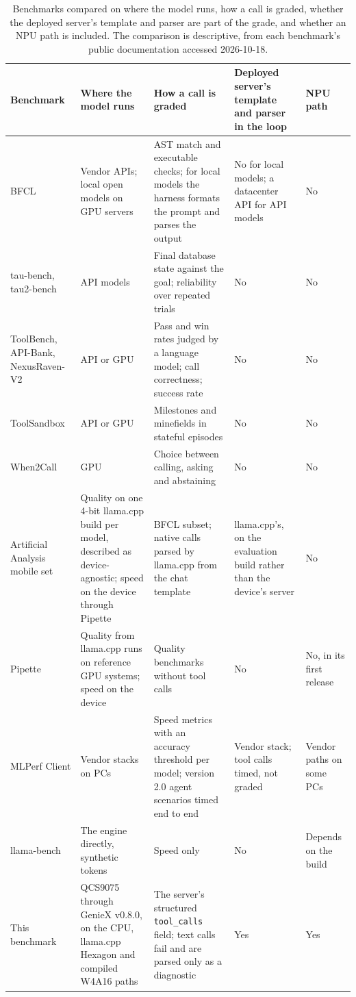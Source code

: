 \documentclass[11pt]{article}
\begin{document}
\begin{table}[tbp]
\centering
\caption{Benchmarks compared on where the model runs, how a call is graded, whether the deployed server's template and parser are part of the grade, and whether an NPU path is included. The comparison is descriptive, from each benchmark's public documentation accessed 2026-10-18.}
\label{tab:related}
\footnotesize
\begin{tabularx}{\linewidth}{@{}>{\raggedright\arraybackslash}p{2.3cm}LLL>{\raggedright\arraybackslash}p{1.7cm}@{}}
\toprule
Benchmark & Where the model runs & How a call is graded & Deployed server's template and parser in the loop & NPU path \\
\midrule
BFCL \citep{bfcl2025,bfclLeaderboard} & Vendor APIs; local open models on GPU servers & AST match and executable checks; for local models the harness formats the prompt and parses the output & No for local models; a datacenter API for API models & No \\
tau-bench, tau2-bench \citep{taubench,tau2bench} & API models & Final database state against the goal; reliability over repeated trials & No & No \\
ToolBench, API-Bank, NexusRaven-V2 \citep{toolbench,apibank,nexusraven} & API or GPU & Pass and win rates judged by a language model; call correctness; success rate & No & No \\
ToolSandbox \citep{toolsandbox} & API or GPU & Milestones and minefields in stateful episodes & No & No \\
When2Call \citep{when2call} & GPU & Choice between calling, asking and abstaining & No & No \\
Artificial Analysis mobile set \citep{aaMobile,aaMobileMethod} & Quality on one 4-bit llama.cpp build per model, described as device-agnostic; speed on the device through Pipette & BFCL subset; native calls parsed by llama.cpp from the chat template & llama.cpp's, on the evaluation build rather than the device's server & No \\
Pipette \citep{pipette,pipetteMethod} & Quality from llama.cpp runs on reference GPU systems; speed on the device & Quality benchmarks without tool calls & No & No, in its first release \\
MLPerf Client \citep{mlperfClient} & Vendor stacks on PCs & Speed metrics with an accuracy threshold per model; version 2.0 agent scenarios timed end to end & Vendor stack; tool calls timed, not graded & Vendor paths on some PCs \\
llama-bench \citep{llamabench} & The engine directly, synthetic tokens & Speed only & No & Depends on the build \\
This benchmark & QCS9075 through GenieX v0.8.0, on the CPU, llama.cpp Hexagon and compiled W4A16 paths & The server's structured \texttt{tool\_calls} field; text calls fail and are parsed only as a diagnostic & Yes & Yes \\
\bottomrule
\end{tabularx}
\end{table}
\end{document}
